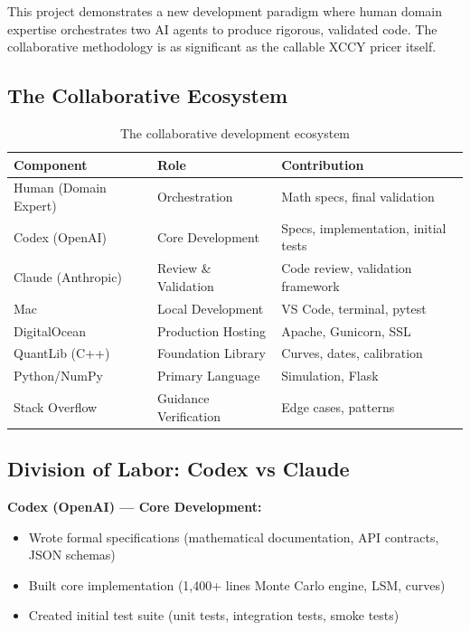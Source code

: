 \documentclass[10pt,a4paper]{article}
\begin{document}
This project demonstrates a new development paradigm where human domain expertise orchestrates two AI agents to produce rigorous, validated code. The collaborative methodology is as significant as the callable XCCY pricer itself.

\subsection{The Collaborative Ecosystem}

\begin{table}[H]
\centering
\begin{tabular}{lll}
\toprule
\textbf{Component} & \textbf{Role} & \textbf{Contribution} \\
\midrule
Human (Domain Expert) & Orchestration & Math specs, final validation \\
Codex (OpenAI) & Core Development & Specs, implementation, initial tests \\
Claude (Anthropic) & Review \& Validation & Code review, validation framework \\
\midrule
Mac & Local Development & VS Code, terminal, pytest \\
DigitalOcean & Production Hosting & Apache, Gunicorn, SSL \\
QuantLib (C++) & Foundation Library & Curves, dates, calibration \\
Python/NumPy & Primary Language & Simulation, Flask \\
Stack Overflow & Guidance Verification & Edge cases, patterns \\
\bottomrule
\end{tabular}
\caption{The collaborative development ecosystem}
\end{table}

\subsection{Division of Labor: Codex vs Claude}

\textbf{Codex (OpenAI) --- Core Development:}
\begin{itemize}
    \item Wrote formal specifications (mathematical documentation, API contracts, JSON schemas)
    \item Built core implementation (1,400+ lines Monte Carlo engine, LSM, curves)
    \item Created initial test suite (unit tests, integration tests, smoke tests)
\end{itemize}
\end{document}
